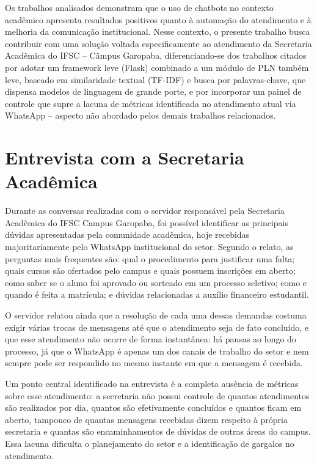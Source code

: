 \documentclass[12pt]{article}
\begin{document}
Os trabalhos analisados demonstram que o uso de chatbots no contexto
acadêmico apresenta resultados positivos quanto à automação do
atendimento e à melhoria da comunicação institucional. Nesse contexto, o
presente trabalho busca contribuir com uma solução voltada
especificamente ao atendimento da Secretaria Acadêmica do IFSC -- Câmpus
Garopaba, diferenciando-se dos trabalhos citados por adotar um framework
leve (Flask) combinado a um módulo de PLN também leve, baseado em similaridade textual (TF-IDF) e busca por palavras-chave, que dispensa modelos de linguagem de grande porte, e por incorporar um painel de controle que supre a lacuna de métricas
identificada no atendimento atual via WhatsApp -- aspecto não abordado
pelos demais trabalhos relacionados.

\section{Entrevista com a Secretaria Acadêmica}\label{sec:entrevista}

Durante as conversas realizadas com o servidor responsável pela
Secretaria Acadêmica do IFSC Campus Garopaba, foi possível identificar as
principais dúvidas apresentadas pela comunidade acadêmica, hoje recebidas
majoritariamente pelo WhatsApp institucional do setor. Segundo o relato,
as perguntas mais frequentes são: qual o procedimento para justificar uma
falta; quais cursos são ofertados pelo campus e quais possuem inscrições
em aberto; como saber se o aluno foi aprovado ou sorteado em um processo
seletivo; como e quando é feita a matrícula; e dúvidas relacionadas a
auxílio financeiro estudantil.

O servidor relatou ainda que a resolução de cada uma dessas demandas
costuma exigir várias trocas de mensagens até que o atendimento seja de
fato concluído, e que esse atendimento não ocorre de forma instantânea:
há pausas ao longo do processo, já que o WhatsApp é apenas um dos canais
de trabalho do setor e nem sempre pode ser respondido no mesmo instante
em que a mensagem é recebida.

Um ponto central identificado na entrevista é a completa ausência de
métricas sobre esse atendimento: a secretaria não possui controle de
quantos atendimentos são realizados por dia, quantos são efetivamente
concluídos e quantos ficam em aberto, tampouco de quantas mensagens
recebidas dizem respeito à própria secretaria e quantas são
encaminhamentos de dúvidas de outras áreas do campus. Essa lacuna
dificulta o planejamento do setor e a identificação de gargalos no
atendimento.
\end{document}
